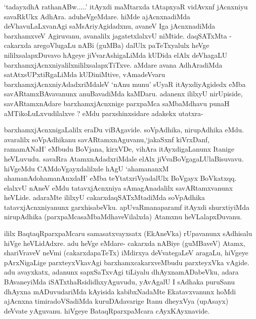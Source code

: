 \begin{artha}
`tadayxdhA rathanABw.....' itAyxdi maMtarxda tAtapxyaR vidAvxnf jAcnxniyu \break savaRkUkx AdhAra. aduheVgeMdare. hiMde ajAcnxnadiMda deVhavuLaLxvanAgi saMsAri\-yAgidadxnu, avaneV Iga jAcnxnadiMda barxhamxveV Agiruvanu, avanalilx jagatetxlalxvU niMtide. daqSATxMta - cakarxda aregoVlugaLu nABi (guMBa) dalUlx paTeTxyalulx heVge nililxsalapxDuvavo hAgeye jiVvarAshigaLiMda kUDida elAlx deVhagaLU barxhamxjAcnxniyalilxnililxsalapxTiTxve. aMdare avana AdhAradiMda satAtxsUPxtiRgaLiMda kUDiniMtive, vAmadeVvaru barxhamxjAcnxniyAdadxriMdaleV `nAnu munu' sUyaR itAyxdiyAgidedx eMba savARtamxBAvavanunx anuBavadiMda kaMDaru. adanenx ililxyU nirUpiside, savARtamxnAdare barxhamxjAcnxnige parxpaMca saMbaMdhavu punaH aMTikoLuLxvudilalxve ? eMdu parxshinxsidare adakekx utatxra- 

barxhamxjAcnxnigaLalilx eraDu viBAgavide. soVpAdhika, nirupAdhika eMdu. ava\-ralilx soVpAdhikanu savARtamxnAguvanu,`jakaSxnf kiVrxDanf, ramamANaH' eMbudu \-BoVjana, kirxVDe, vihAra itAyxdigaLanunx Itanige heVLuvudu. savaRra AtamxnAdadx\-riMdale elAlx jiVvaBoVgagaLUlaBisuvavu. hiVgeMdu CAMdoVgayxdalilxde hAgU `ahamananxM ahamanAdo\s hamanAnxdaH' eMba teYtatxriVyadalUlx BoVgayx BoVkatxqq. elalxvU nAneV eMdu tatavxjAcnxniya sAmagAnadalilx savARtamxvanunx heVLide. adaraMte ililxyU cakarxdaqSATxMtadiMda soVpAdhika tatavxjAcnxniyanunx garxhisabeVku. apUvaR\-manaparamf itAyxdi shurxtiyiMda nirupAdhika (parxpaMcasaMbaMdhaveVilalxda) Atamxnu heVLalapxDuvanu.
\end{artha}

\begin{center}


\end{center}

\begin{artha}
ililx BaqtaqRparxpaMcaru samasatxvayxsatx (EkAneVka) rUpavanunx sAdhisalu hiVge heVLidAdxre. adu heVge eMdare- cakarxda nABiye (guMBaveV) Atamx, shariVraveV neVmi (cakarxdapaTeTx) iMdirxya deVvategaLeV aragaLu, hiVgeye pArxNigaLige parxteyxVkavAgi barxhamxcakarxveMbudu parxteyxVka vAgide. adu avayxkatx, adanunx sapxSaTxvAgi tiLiyalu dhAyxnamADabeVku, adara BAvaneyiMda iSATxthaRsididhxyAguvudu, yAvAgalU I sAdhaka puruSanu dhAyxna mADuvudariMda kAyisida kabibxNadaMte Ekatavxvanunx hoMdi ajAcnxna timiradoVSadiMda kuruDAdavarige Itanu dheyxVya (upAsayx) deVvate  yAguvanu. hiVgeye BataqRparxpaMcara cAyxKAyxnavide.
\end{artha}

